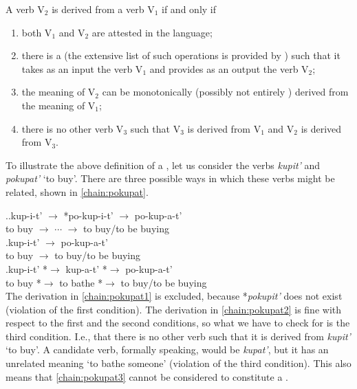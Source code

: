 \begin{definition}\label{def:history}
A verb V$_2$ is derived from a verb V$_1$ if and only if
\begin{enumerate}
\item both V$_1$ and V$_2$ are attested in the language;
\item there is a  (the extensive list of such operations is provided by \citealt{Shvedova:82}) such that it takes as an input the verb V$_1$ and provides as an output the verb V$_2$;
\item the meaning of V$_2$ can be monotonically (possibly not entirely ) derived from the meaning of V$_1$;
\item there is no other verb V$_3$ such that V$_3$ is derived from V$_1$ and V$_2$ is derived from V$_3$.
\end{enumerate}
\end{definition}

To illustrate the above definition of a , let us consider the verbs \textit{kupit'\textsuperscript{\PF}} and \textit{pokupat'\textsuperscript{\IPF}} `to buy'. There are three possible ways in which these verbs might be related, shown in \ref{chain:pokupat}.

\ex.\label{chain:pokupat}\ag.\label{chain:pokupat1}kup-i-t'\textsuperscript{\PF} $\rightarrow$ *po-kup-i-t' $\rightarrow$ po-kup-a-t'\textsuperscript{\IPF}\\	
{to buy} $\rightarrow$ $\cdots$ $\rightarrow$ {to buy/to be buying}\\
\bg.\label{chain:pokupat2}kup-i-t'\textsuperscript{\PF} $\rightarrow$ po-kup-a-t'\textsuperscript{\IPF}\\
{to buy} $\rightarrow$ {to buy/to be buying}\\
\bg.\label{chain:pokupat3}kup-i-t'\textsuperscript{\PF} *$\rightarrow$ kup-a-t'\textsuperscript{\IPF} *$\rightarrow$ po-kup-a-t'\textsuperscript{\IPF}\\
{to buy} *$\rightarrow$ {to bathe} *$\rightarrow$ {to buy/to be buying}\\

The derivation in \ref{chain:pokupat1} is excluded, because *\textit{pokupit'} does not exist (violation of the first condition). The derivation in \ref{chain:pokupat2} is fine with respect to the first and the second conditions, so what we have to check for is the third condition. I.e., that there is no other verb such that it is derived from \textit{kupit'}\textsuperscript{\PF} `to buy'.  A candidate verb, formally speaking, would be \textit{kupat'\textsuperscript{\IPF}}, but it has an unrelated meaning `to bathe someone' (violation of the third condition). This also means that \ref{chain:pokupat3} cannot be considered to constitute a .  

